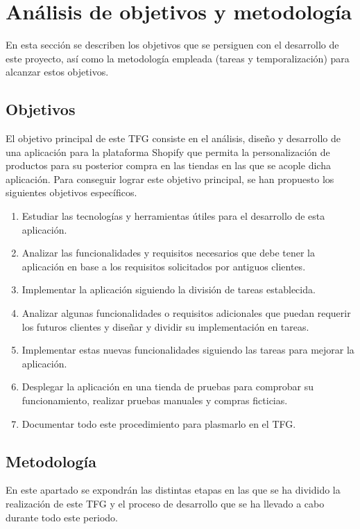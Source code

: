 \documentclass[12pt]{article}
\begin{document}
\newpage
\section{Análisis de objetivos y metodología}
En esta sección se describen los objetivos que se persiguen con el desarrollo de este proyecto, así como la metodología empleada (tareas y temporalización) para alcanzar estos objetivos.

\subsection{Objetivos}

El objetivo principal de este TFG consiste en el análisis, diseño y desarrollo de una aplicación para la plataforma Shopify que permita
la personalización de productos para su posterior compra en las tiendas en las que se acople dicha aplicación. Para conseguir lograr este objetivo 
principal, se han propuesto los siguientes objetivos específicos.

\begin{enumerate}
    \item Estudiar las tecnologías y herramientas útiles para el desarrollo de esta aplicación. \label{item:objetivo1}
    \item Analizar las funcionalidades y requisitos necesarios que debe tener la aplicación en base a los requisitos solicitados por antiguos clientes. \label{item:objetivo2}
    \item Implementar la aplicación siguiendo la división de tareas establecida. \label{item:objetivo4}
    \item Analizar algunas funcionalidades o requisitos adicionales que puedan requerir los futuros clientes y diseñar y dividir su implementación en tareas. \label{item:objetivo5}
    \item Implementar estas nuevas funcionalidades siguiendo las tareas para mejorar la aplicación. \label{item:objetivo6}
    \item Desplegar la aplicación en una tienda de pruebas para comprobar su funcionamiento, realizar pruebas manuales y compras ficticias. \label{item:objetivo7}
    \item Documentar todo este procedimiento para plasmarlo en el TFG. \label{item:objetivo8}
\end{enumerate}

\subsection{Metodología}
En este apartado se expondrán las distintas etapas en las que se ha dividido la realización de este TFG y el proceso de desarrollo que se ha 
llevado a cabo durante todo este periodo.
\end{document}
